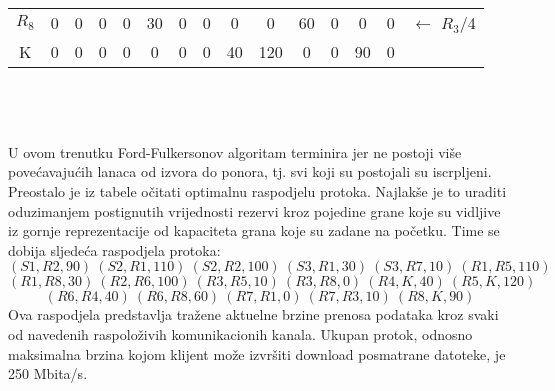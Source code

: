 \documentclass[12pt]{article}
\begin{document}
\begin{enumerate}
\begin{tabular}{|c|c|c|c|c|c|c|c|c|c|c|c|c|c|l}
$R_8$ & 0   & {\color[HTML]{000000} 0}        & {\color[HTML]{000000} 0}        & {\color[HTML]{000000} 0}        & {\color[HTML]{000000} 30}  & {\color[HTML]{000000} 0}   & {\color[HTML]{000000} 0}   & {\color[HTML]{000000} 0}  & {\color[HTML]{000000} 0}   & {\color[HTML]{000000} 60} & {\color[HTML]{000000} 0}   & {\color[HTML]{000000} 0}   & {\color[HTML]{000000} 0}   & ${\leftarrow}$ $R_3$/4 \\ \cline{1-14}
K     & 0   & {\color[HTML]{000000} 0}        & {\color[HTML]{000000} 0}        & {\color[HTML]{000000} 0}        & {\color[HTML]{000000} 0}   & {\color[HTML]{000000} 0}   & {\color[HTML]{000000} 0}   & {\color[HTML]{000000} 40} & {\color[HTML]{000000} 120} & {\color[HTML]{000000} 0}  & {\color[HTML]{000000} 0}   & {\color[HTML]{000000} 90}  & {\color[HTML]{000000} 0}   &                        \\ \cline{1-14}
\end{tabular}
\\
\\
\\
U ovom trenutku Ford-Fulkersonov algoritam terminira jer ne postoji više povećavajućih lanaca
od izvora do ponora, tj. svi koji su postojali su iscrpljeni. Preostalo je iz tabele očitati optimalnu
raspodjelu protoka. Najlakše je to uraditi oduzimanjem postignutih vrijednosti rezervi kroz
pojedine grane koje su vidljive iz gornje reprezentacije od kapaciteta grana koje su zadane na
početku. Time se dobija sljedeća raspodjela protoka: \\
\begin{equation*}
    (S1, R2, 90)~(S2, R1, 110)~(S2, R2, 100)~(S3, R1, 30)~(S3, R7, 10)~(R1, R5, 110)   
\end{equation*}   
\begin{equation*}
    (R1, R8, 30)~(R2, R6, 100)~(R3, R5, 10)~(R3, R8,0)~(R4, K, 40)~(R5, K, 120)  
\end{equation*}   
\begin{equation*}
    (R6, R4, 40)~(R6, R8, 60)~(R7, R1, 0)~(R7, R3, 10)~(R8, K, 90)  
\end{equation*}
Ova raspodjela predstavlja tražene aktuelne brzine prenosa podataka kroz svaki od navedenih
raspoloživih komunikacionih kanala. Ukupan protok, odnosno maksimalna brzina kojom klijent
može izvršiti download posmatrane datoteke, je 250 Mbita/s.


\end{enumerate}
\end{document}
